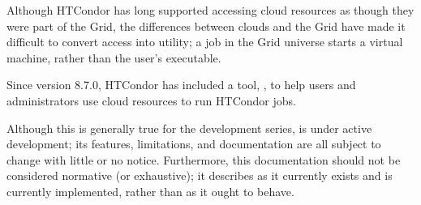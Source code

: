 Although HTCondor has long supported accessing cloud resources as though they
were part of the Grid, the differences between clouds and the Grid have
made it difficult to convert access into utility; a job in the Grid universe
starts a virtual machine, rather than the user's executable.

Since version 8.7.0, HTCondor has included a tool, , to help
users and administrators use cloud resources to run HTCondor jobs.

Although this is generally true for the development series, 
is under active development; its features, limitations, and documentation
are all subject to change with little or no notice.  Furthermore, this
documentation should not be considered normative (or exhaustive); it describes
 as it currently exists and is currently implemented, rather
than as it ought to behave.








